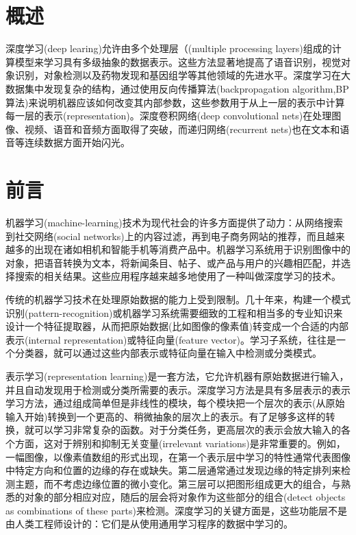 \section{概述}
深度学习(deep learing)允许由多个处理层（(multiple processing layers)组成的计算模型来学习具有多级抽象的数据表示。这些方法显著地提高了语音识别，视觉对象识别，对象检测以及药物发现和基因组学等其他领域的先进水平。深度学习在大数据集中发现复杂的结构，通过使用反向传播算法(backpropagation algorithm,BP算法)来说明机器应该如何改变其内部参数，这些参数用于从上一层的表示中计算每一层的表示(representation)。深度卷积网络(deep convolutional nets)在处理图像、视频、语音和音频方面取得了突破，而递归网络(recurrent nets)也在文本和语音等连续数据方面开始闪光。

\section{前言}
机器学习(machine-learning)技术为现代社会的许多方面提供了动力：从网络搜索到社交网络(social networks)上的内容过滤，再到电子商务网站的推荐，而且越来越多的出现在诸如相机和智能手机等消费产品中。机器学习系统用于识别图像中的对象，把语音转换为文本，将新闻条目、帖子、或产品与用户的兴趣相匹配，并选择搜索的相关结果。这些应用程序越来越多地使用了一种叫做深度学习的技术。

传统的机器学习技术在处理原始数据的能力上受到限制。几十年来，构建一个模式识别(pattern-recognition)或机器学习系统需要细致的工程和相当多的专业知识来设计一个特征提取器，从而把原始数据(比如图像的像素值)转变成一个合适的内部表示(internal representation)或特征向量(feature vector)。学习子系统，往往是一个分类器，就可以通过这些内部表示或特征向量在输入中检测或分类模式。


表示学习(representation learning)是一套方法，它允许机器有原始数据进行输入，并且自动发现用于检测或分类所需要的表示。深度学习方法是具有多层表示的表示学习方法，通过组成简单但是非线性的模块，每个模块把一个层次的表示(从原始输入开始)转换到一个更高的、稍微抽象的层次上的表示。有了足够多这样的转换，就可以学习非常复杂的函数。对于分类任务，更高层次的表示会放大输入的各个方面，这对于辨别和抑制无关变量(irrelevant variations)是非常重要的。例如，一幅图像，以像素值数组的形式出现，在第一个表示层中学习的特性通常代表图像中特定方向和位置的边缘的存在或缺失。第二层通常通过发现边缘的特定排列来检测主题，而不考虑边缘位置的微小变化。第三层可以把图形组成更大的组合，与熟悉的对象的部分相应对应，随后的层会将对象作为这些部分的组合(detect objects as combinations of these parts)来检测。深度学习的关键方面是，这些功能层不是由人类工程师设计的：它们是从使用通用学习程序的数据中学习的。 

